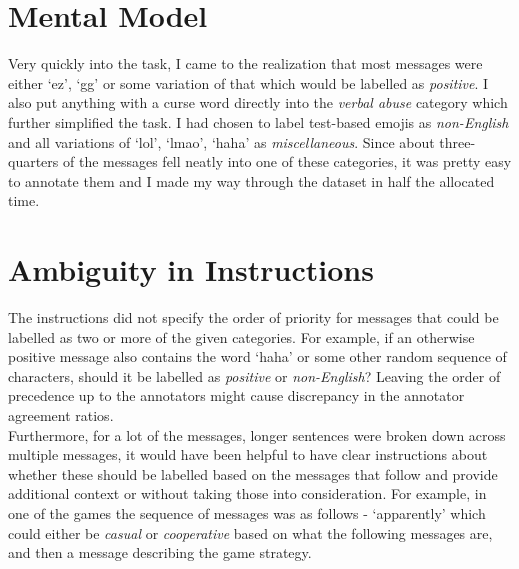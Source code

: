 \documentclass[titlepage]{article}
\begin{document}
\section{Mental Model}
Very quickly into the task, I came to the realization that most messages were either `ez', `gg' or some variation 
of that which would be labelled as \emph{positive}. I also put anything with a curse word directly into the \emph{verbal abuse}
category which further simplified the task. I had chosen to label test-based emojis as \emph{non-English} and all 
variations of `lol', `lmao', `haha' as \emph{miscellaneous}. Since about three-quarters of the messages fell neatly 
into one of these categories, it was pretty easy to annotate them and I made my way through the dataset in half the allocated time.

\section{Ambiguity in Instructions}
The instructions did not specify the order of priority for messages that could be labelled as two or more of the given 
categories. For example, if an otherwise positive message also contains the word `haha' or some other random sequence of 
characters, should it be labelled as \emph{positive} or \emph{non-English}? Leaving the order of precedence up to the annotators
might cause discrepancy in the annotator agreement ratios.\\
\newline
Furthermore, for a lot of the messages, longer sentences were broken down across multiple messages, it would have been helpful to 
have clear instructions about whether these should be labelled based on the messages that follow and provide additional context or 
without taking those into consideration. For example, in one of the games the sequence of messages was as follows - `apparently' which 
could either be \emph{casual} or \emph{cooperative} based on what the following messages are, and then a message describing the game 
strategy. 
\end{document}
